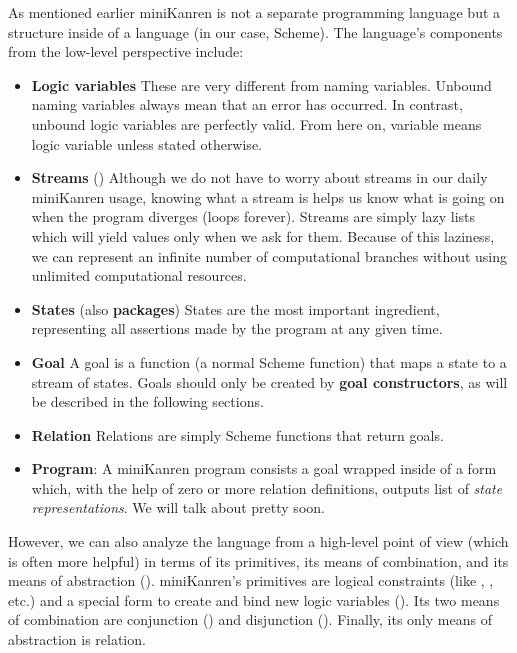 As mentioned earlier miniKanren is not a separate programming language but a structure inside of a language (in our case, Scheme). The language's components from the low-level perspective include:
\begin{itemize}
\item \textbf{Logic variables} These are very different from naming variables. Unbound naming variables always mean that an error has occurred. In contrast, unbound logic variables are perfectly valid. From here on, variable means logic variable unless stated otherwise.
\item \textbf{Streams} (\cite{sicp}) Although we do not have to worry about streams in our daily miniKanren usage, knowing what a stream is helps us know what is going on when the program diverges (loops forever). Streams are simply lazy lists which will yield values only when we ask for them. Because of this laziness, we can represent an infinite number of computational branches without using unlimited computational resources.
\item \textbf{States} (also \textbf{packages}) States are the most important ingredient, representing all assertions made by the program at any given time.
\item \textbf{Goal} A goal is a function (a normal Scheme function) that maps a state to a stream of states. Goals should only be created by \textbf{goal constructors}, as will be described in the following sections.
\item \textbf{Relation} Relations are simply Scheme functions that return goals.
\item \textbf{Program}: A miniKanren program consists a goal wrapped inside of a  form which, with the help of zero or more relation definitions, outputs list of \textit{state representations}. We will talk about  pretty soon.
\end{itemize}

However, we can also analyze the language from a high-level point of view (which is often more helpful) in terms of its primitives, its means of combination, and its means of abstraction (\cite[359]{sicp}). miniKanren's primitives are logical constraints (like \code{==}, \code{=/=}, etc.) and a special form to create and bind new logic variables (). Its two means of combination are conjunction () and disjunction (). Finally, its only means of abstraction is relation.

